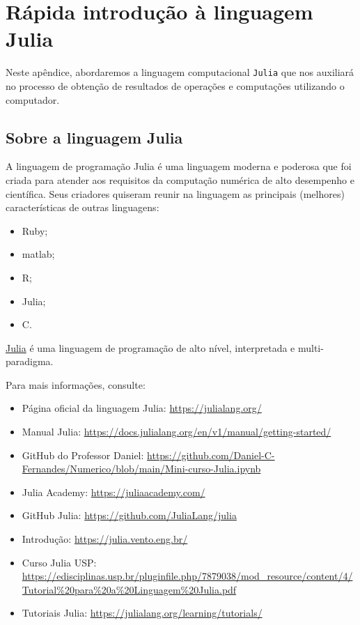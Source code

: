 
\chapter{Rápida introdução à linguagem Julia}\label{cap:julia}

Neste apêndice, abordaremos a linguagem computacional \verb+Julia+ que nos auxiliará no processo de obtenção de resultados de operações e computações utilizando o computador.

\section{Sobre a linguagem Julia}

A linguagem de programação Julia é uma linguagem moderna e poderosa que foi criada para atender aos requisitos da computação numérica de alto desempenho e científica.
Seus criadores quiseram reunir na linguagem as principais (melhores) características de outras linguagens:

\begin{itemize}
\item Ruby;
\item matlab;
\item R;
\item Julia;
\item C.
\end{itemize}

\href{https://julialang.org/}{Julia} é uma linguagem de programação de alto nível, interpretada e multi-paradigma. 

Para mais informações, consulte:

\begin{itemize}
\item Página oficial da linguagem Julia: \url{https://julialang.org/}
\item Manual Julia: \url{https://docs.julialang.org/en/v1/manual/getting-started/}
\item GitHub do Professor Daniel: \url{https://github.com/Daniel-C-Fernandes/Numerico/blob/main/Mini-curso-Julia.ipynb}
\item Julia Academy: \url{https://juliaacademy.com/}
\item GitHub Julia: \url{https://github.com/JuliaLang/julia}
\item Introdução: \url{https://julia.vento.eng.br/}
\item Curso Julia USP: \url{https://edisciplinas.usp.br/pluginfile.php/7879038/mod_resource/content/4/Tutorial%20para%20a%20Linguagem%20Julia.pdf}
\item Tutoriais Julia: \url{https://julialang.org/learning/tutorials/}
\end{itemize}

